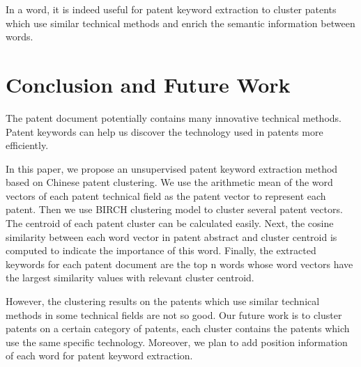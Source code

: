 \documentclass[conference]{IEEEtran}
\begin{document}
\begin{CJK}{UTF8}{gbsn}
	In a word, it is indeed useful for patent keyword extraction to cluster patents which use similar technical methods and enrich the semantic information between words.
	
	\section{Conclusion and Future Work}
	The patent document potentially contains many innovative technical methods. Patent keywords can help us discover the technology used in patents more efficiently.
	
	In this paper, we propose an unsupervised patent keyword extraction method based on Chinese patent clustering. We use the arithmetic mean of the word vectors of each patent technical field as the patent vector to represent each patent. Then we use BIRCH clustering model to cluster several patent vectors. The centroid of each patent cluster can be calculated easily. Next, the cosine similarity between each word vector in patent abstract and cluster centroid is computed to indicate the importance of this word. Finally, the extracted keywords for each patent document are the top n words whose word vectors have the largest similarity values with relevant cluster centroid.
	
	However, the clustering results on the patents which use similar technical methods in some technical fields are not so good. Our future work is to cluster patents on a certain category of patents, each cluster contains the patents which use the same specific technology. Moreover, we plan to add position information of each word for patent keyword extraction.
	
	\end{CJK}



\end{document}

